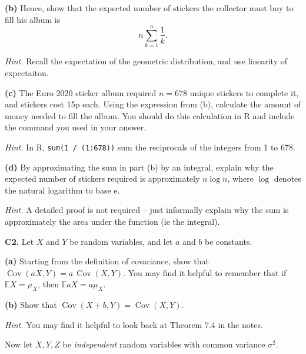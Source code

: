 \documentclass[
  a4paper,
]{book}
\theoremstyle{definition}
\theoremstyle{definition}
\theoremstyle{definition}
\theoremstyle{definition}
\theoremstyle{remark}
\begin{document}
\textbf{(b)} Hence, show that the expected number of stickers the collector must buy to fill his album is
\[ n \sum_{k=1}^n \frac{1}{k} . \]

\begin{myanswers}
\emph{Hint.} Recall the expectation of the geometric distribution, and use linearity of expectaiton.

\end{myanswers}

\textbf{(c)} The Euro 2020 sticker album required \(n = 678\) unique stickers to complete it, and stickers cost 15p each. Using the expression from (b), calculate the amount of money needed to fill the album. You should do this calculation in R and include the command you used in your answer.

\begin{myanswers}
\emph{Hint.} In R, \texttt{sum(1\ /\ (1:678))} sum the reciprocals of the integers from 1 to 678.

\end{myanswers}

\textbf{(d)} By approximating the sum in part (b) by an integral, explain why the expected number of stickers required is approximately \(n \log n\), where \(\log\) denotes the natural logarithm to base \(\mathrm e\).

\begin{myanswers}
\emph{Hint.} A detailed proof is not required -- just informally explain why the sum is approximately the area under the function (ie the integral).

\end{myanswers}

\textbf{C2.} Let \(X\) and \(Y\) be random variables, and let \(a\) and \(b\) be constants.

\textbf{(a)} Starting from the definition of covariance, show that \(\operatorname{Cov}(aX, Y) = a\,\operatorname{Cov}(X,Y)\). You may find it helpful to remember that if \(\mathbb EX = \mu_X\), then \(\mathbb EaX = a\mu_X\).

\textbf{(b)} Show that \(\operatorname{Cov}(X + b, Y) = \operatorname{Cov}(X, Y)\).

\begin{myanswers}
\emph{Hint.} You may find it helpful to look back at Theorem 7.4 in the notes.

\end{myanswers}

Now let \(X, Y, Z\) be \emph{independent} random variables with common variance \(\sigma^2\).
\end{document}
